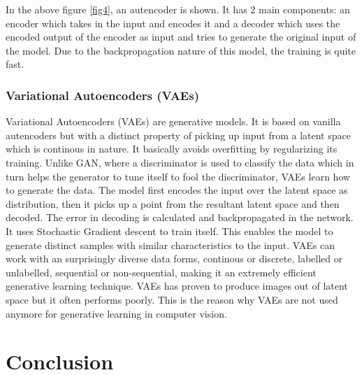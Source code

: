 \documentclass[conference]{IEEEtran}
\begin{document}
In the above figure \ref{fig4}, an autencoder is shown. It has 2 main components: an encoder which takes in the input and encodes it and a decoder which uses the encoded output of the encoder as input and tries to generate the original input of the model. Due to the backpropagation nature of this model, the training is quite fast.

\subsubsection{Variational Autoencoders (VAEs)}
Variational Autoencoders (VAEs) are generative models. It is based on vanilla autencoders but with a distinct property of picking up input from a latent space which is continous in nature. It basically avoids overfitting by regularizing its training. Unlike GAN, where a discriminator is used to classify the data which in turn helps the generator to tune itself to fool the discriminator, VAEs learn how to generate the data. The model first encodes the input over the latent space as distribution, then it picks up a point from the resultant latent space and then decoded. The error in decoding is calculated and backpropagated in the network. It uses Stochastic Gradient descent to train itself. This enables the model to generate distinct samples with similar characteristics to the input. VAEs can work with an surprisingly diverse data forms, continous or discrete, labelled or unlabelled, sequential or non-sequential, making it an extremely efficient generative learning technique. VAEs has proven to produce images out of latent space but it often performs poorly. This is the reason why VAEs are not used anymore for generative learning in computer vision.

\section{Conclusion}
\label{conclusion}
\end{document}
